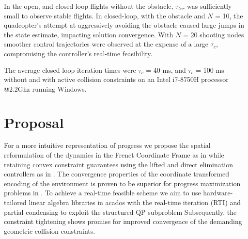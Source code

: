 \documentclass[conference]{IEEEtran}
\begin{document}
In the open, and closed loop flights without the obstacle, $\tau_{trr}$ was sufficiently small to observe stable flights. In closed-loop, with the obstacle and $N$ = 10, the quadcopter's attempt at aggressively avoiding the obstacle caused large jumps in the state estimate, impacting solution convergence. With $N$ = 20 shooting nodes smoother control trajectories were observed at the expense of a large $\tau_{c}$, compromising the controller's real-time feasibility.


The average closed-loop iteration times were $\tau_{c}$ = 40 ms, and $\tau_{c}$ = 100 ms without and with active collision constraints on an Intel i7-8750H processor @2.2Ghz running Windows.
\section{Proposal}\label{Section7}
\par For a more intuitive representation of progress we propose the spatial reformulation of the dynamics in the Frenet Coordinate Frame as in \cite{arrizabalaga_towards_2022} while retaining convex constraint guarantees using the lifted and direct elimination controllers as in \cite{reiter_frenet-cartesian_2023}. The convergence properties of the coordinate transformed encoding of the environment is proven to be superior for progress maximization problems in \cite{werling_invariant_2010}.
To achieve a real-time feasible scheme we aim to use hardware-tailored linear algebra libraries \cite{frison_blasfeo_2018} in acados \cite{verschueren_acados_2020} with the real-time iteration \cite{gros_linear_2020} (RTI) and partial condensing to exploit the structured QP subproblem \cite{frison_hpipm_2020}
Subsequently, the constraint tightening shows promise for improved convergence of the demanding geometric collision constraints.


\end{document}
